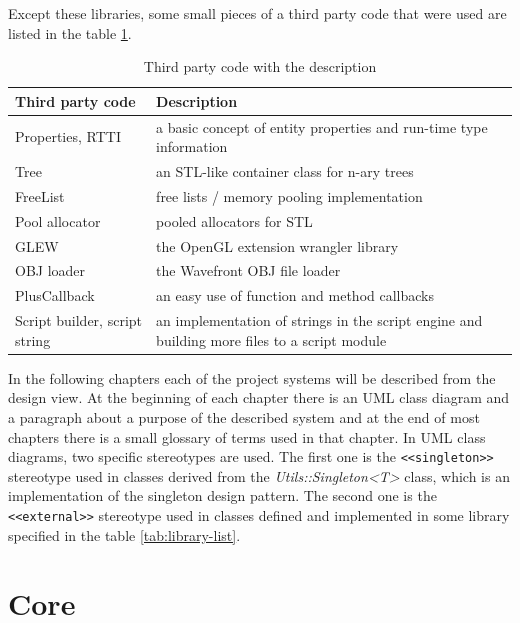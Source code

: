 \documentclass[a4paper, 12pt]{report}
\begin{document}
Except these libraries, some small pieces of a third party code that were used are listed in the table \ref{tab:code-list}.

\begin{table}[htbp]
	\centering
		\begin{tabular}{|p{0.28\hsize}|p{0.65\hsize}|}
			\hline
			Third party code & Description\\
			\hline
			Properties, RTTI\cite{gpg5} & a basic concept of entity properties and run-time type information\\
			Tree\cite{tree} & an STL-like container class for n-ary trees\\
			FreeList\cite{gpg5} & free lists / memory pooling implementation\\
			Pool allocator\cite{allocator} & pooled allocators for STL\\
			GLEW\cite{glew} & the OpenGL extension wrangler library\\
			OBJ loader\cite{objloader} & the Wavefront OBJ file loader\\
			PlusCallback\cite{pluscallback} & an easy use of function and method callbacks\\
			Script builder, script string\cite{angelscript} & an implementation of strings in the script engine and building more files to a script module\\
			\hline
		\end{tabular}
	\caption[Third party code with the description]{Third party code with the description}
	\label{tab:code-list}
\end{table}

In the following chapters each of the project systems will be described from the design view. At the beginning of each chapter there is an UML class diagram and a paragraph about a purpose of the described system and at the end of most chapters there is a small glossary of terms used in that chapter. In UML class diagrams, two specific stereotypes are used. The first one is the \verb/<<singleton>>/ stereotype used in classes derived from the \emph{Utils::Singleton<T>} class, which is an implementation of the singleton design pattern. The second one is the \verb/<<external>>/ stereotype used in classes defined and implemented in some library specified in the table \ref{tab:library-list}.


\chapter{Core}
\end{document}
